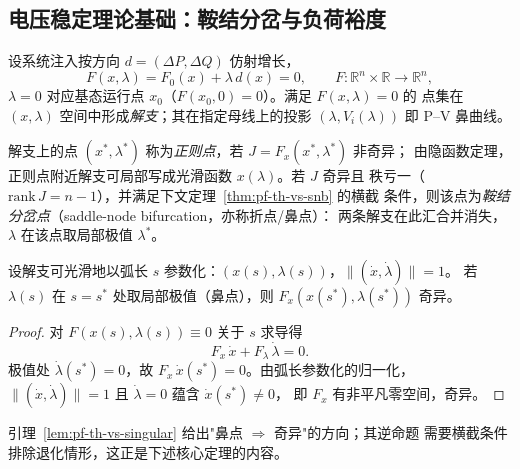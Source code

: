 \subsection{电压稳定理论基础：鞍结分岔与负荷裕度}\label{sec:pf-th-vs-snb}

\begin{definition}[参数化潮流方程与解支]
设系统注入按方向 $d=(\Delta P,\Delta Q)$ 仿射增长，
\begin{equation}
F(x,\lambda)=F_0(x)+\lambda\,d(x)=0,\qquad F:\mathbb{R}^{n}\times\mathbb{R}\to\mathbb{R}^{n},
\end{equation}
$\lambda=0$ 对应基态运行点 $x_0$（$F(x_0,0)=0$）。满足 $F(x,\lambda)=0$ 的
点集在 $(x,\lambda)$ 空间中形成\emph{解支}；其在指定母线上的投影
$(\lambda,V_i(\lambda))$ 即 P--V 鼻曲线。
\end{definition}

\begin{definition}[正则点与鞍结分岔（折点）]
解支上的点 $(x^*,\lambda^*)$ 称为\emph{正则点}，若 $J=F_x(x^*,\lambda^*)$ 非奇异；
由隐函数定理，正则点附近解支可局部写成光滑函数 $x(\lambda)$。若 $J$ 奇异且
秩亏一（$\mathrm{rank}\,J=n-1$），并满足下文定理~\ref{thm:pf-th-vs-snb} 的横截
条件，则该点为\emph{鞍结分岔点}（saddle-node bifurcation，亦称折点/鼻点）：
两条解支在此汇合并消失，$\lambda$ 在该点取局部极值 $\lambda^*$。
\end{definition}

\begin{lemma}[鼻点处雅可比奇异]\label{lem:pf-th-vs-singular}
设解支可光滑地以弧长 $s$ 参数化：$(x(s),\lambda(s))$，$\|(\dot x,\dot\lambda)\|=1$。
若 $\lambda(s)$ 在 $s=s^*$ 处取局部极值（鼻点），则 $F_x(x(s^*),\lambda(s^*))$
奇异。
\end{lemma}
\begin{proof}
对 $F(x(s),\lambda(s))\equiv0$ 关于 $s$ 求导得
\begin{equation}
F_x\,\dot x+F_\lambda\,\dot\lambda=0.
\end{equation}
极值处 $\dot\lambda(s^*)=0$，故 $F_x\,\dot x(s^*)=0$。由弧长参数化的归一化，
$\|(\dot x,\dot\lambda)\|=1$ 且 $\dot\lambda=0$ 蕴含 $\dot x(s^*)\neq0$，
即 $F_x$ 有非平凡零空间，奇异。
\end{proof}

引理~\ref{lem:pf-th-vs-singular} 给出"鼻点 $\Rightarrow$ 奇异"的方向；其逆命题
需要横截条件排除退化情形，这正是下述核心定理的内容。

